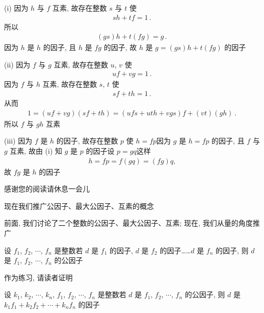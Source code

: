 \begin{pf}
    (i) 因为 $h$ 与 $f$ 互素, 故存在整数 $s$ 与 $t$ 使
    \begin{align*}
        sh + tf = 1 \period
    \end{align*}
    所以
    \begin{align*}
        (gs)h + t(fg) = g \period
    \end{align*}
    因为 $h$ 是 $h$ 的因子, 且 $h$ 是 $fg$ 的因子, 故 $h$ 是 $g = (gs)h + t(fg)$ 的因子\period

    (ii) 因为 $f$ 与 $g$ 互素, 故存在整数 $u$, $v$ 使
    \begin{align*}
        uf + vg = 1 \period
    \end{align*}
    因为 $f$ 与 $h$ 互素, 故存在整数 $s$, $t$ 使
    \begin{align*}
        sf + th = 1 \period
    \end{align*}
    从而
    \begin{align*}
        1 = (uf + vg)(sf + th) = (ufs + uth + vgs)f + (vt)(gh) \period
    \end{align*}
    所以 $f$ 与 $gh$ 互素\period

    (iii) 因为 $f$ 是 $h$ 的因子, 故存在整数 $p$ 使 $h = fp$\period 因为 $g$ 是 $h = fp$ 的因子, 且 $f$ 与 $g$ 互素, 故由 (i) 知 $g$ 是 $p$ 的因子\period 设 $p = gq$\period 这样
    \begin{align*}
        h = fp = f(gq) = (fg)q,
    \end{align*}
    故 $fg$ 是 $h$ 的因子\period
\end{pf}

感谢您的阅读\period 请休息一会儿\period

\myLine

现在我们推广公因子、最大公因子、互素的概念\period

前面, 我们讨论了二个整数的公因子、最大公因子、互素; 现在, 我们从量的角度推广\period

\begin{definition}
    设 $f_1$, $f_2$, $\cdots$, $f_n$ 是整数\period 若 $d$ 是 $f_1$ 的因子, $d$ 是 $f_2$ 的因子……$d$ 是 $f_n$ 的因子, 则 $d$ 是 $f_1$, $f_2$, $\cdots$, $f_n$ 的公因子\period
\end{definition}

作为练习, 请读者证明
\begin{proposition}
    设 $k_1$, $k_2$, $\cdots$, $k_n$, $f_1$, $f_2$, $\cdots$, $f_n$ 是整数\period 若 $d$ 是 $f_1$, $f_2$, $\cdots$, $f_n$ 的公因子, 则 $d$ 是 $k_1 f_1 + k_2 f_2 + \cdots + k_n f_n$ 的因子\period
\end{proposition}

